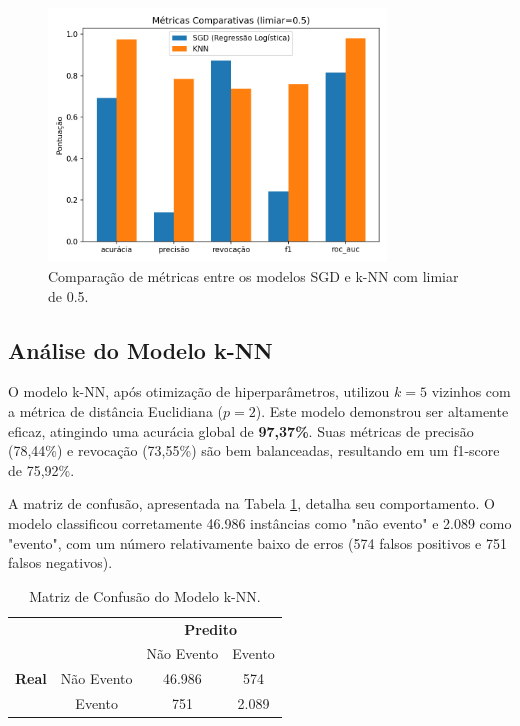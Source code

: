 \documentclass[12pt]{article}
\begin{document}
\begin{figure}[h!]
    \centering
    \includegraphics[width=0.8\textwidth]{image/metrics_comparison.png}
    \caption{Comparação de métricas entre os modelos SGD e k-NN com limiar de 0.5.}
    \label{fig:comparativo}
\end{figure}

\subsection{Análise do Modelo k-NN}
O modelo k-NN, após otimização de hiperparâmetros, utilizou $k=5$ vizinhos com a métrica de distância Euclidiana ($p=2$). Este modelo demonstrou ser altamente eficaz, atingindo uma acurácia global de \textbf{97,37\%}. Suas métricas de precisão (78,44\%) e revocação (73,55\%) são bem balanceadas, resultando em um f1-score de 75,92\%.

A matriz de confusão, apresentada na Tabela \ref{tab:knn_matrix}, detalha seu comportamento. O modelo classificou corretamente 46.986 instâncias como "não evento" e 2.089 como "evento", com um número relativamente baixo de erros (574 falsos positivos e 751 falsos negativos).

\begin{table}[h!]
    \centering
    \caption{Matriz de Confusão do Modelo k-NN.}
    \label{tab:knn_matrix}
    \begin{tabular}{cc|cc}
        & & \multicolumn{2}{c}{\textbf{Predito}} \\
        & & Não Evento & Evento \\ \hline
        \textbf{Real} & Não Evento & 46.986 & 574 \\
        & Evento & 751 & 2.089
    \end{tabular}
\end{table}
\end{document}
